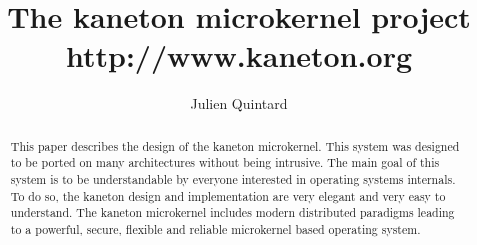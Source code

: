 
%
%



%
%


%
%

\title{The kaneton microkernel project \\
       \scriptsize{http://www.kaneton.org}}

%
%

\author{\small{Julien Quintard}}

%
%



%
%

\maketitle

%
%

\begin{abstract}

This paper describes the design of the kaneton microkernel.
This system was designed to be ported on many architectures without being
intrusive. The main goal of this system is to be understandable
by everyone interested in operating systems internals. To do so, the kaneton
design and implementation are very elegant and very easy to understand.
The kaneton microkernel includes modern distributed paradigms
leading to a powerful, secure, flexible and reliable microkernel based
operating system.

\end{abstract}

%
%


